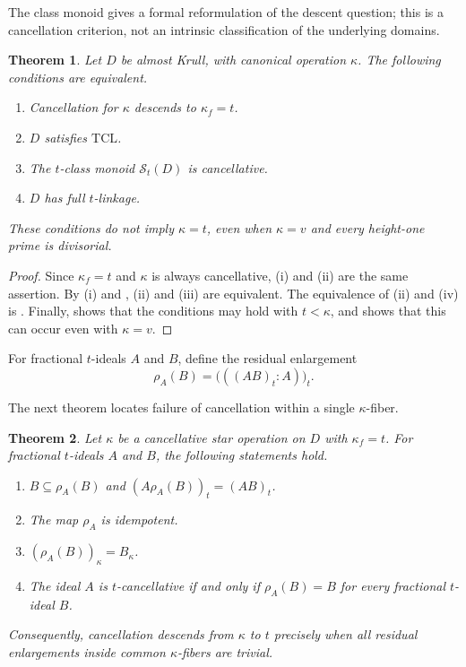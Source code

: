 \documentclass[11pt]{amsart}
\newtheorem{theorem}{Theorem}[section]
\theoremstyle{definition}
\theoremstyle{remark}
\newcommand{\Ctred}{\mathcal S_t}
\newcommand{\TCL}{\mathrm{TCL}}
\begin{document}
The class monoid gives a formal reformulation of the descent question;
this is a cancellation criterion, not an intrinsic classification of the
underlying domains.

\begin{theorem}\label{thm:exact-descent}
Let $D$ be almost Krull, with canonical operation $\kappa$.  The following
conditions are equivalent.
\begin{enumerate}[label=\textup{(\roman*)}]
\item Cancellation for $\kappa$ descends to $\kappa_f=t$.
\item $D$ satisfies $\TCL$.
\item The $t$-class monoid $\Ctred(D)$ is cancellative.
\item $D$ has full $t$-linkage.
\end{enumerate}
These conditions do not imply $\kappa=t$, even when $\kappa=v$ and every
height-one prime is divisorial.
\end{theorem}

\begin{proof}
Since $\kappa_f=t$ and $\kappa$ is always cancellative,
(i) and (ii) are the same assertion.  By
(i) and , (ii) and (iii) are equivalent.
The equivalence of (ii) and (iv) is .  Finally,
 shows that the conditions may hold with
$t<\kappa$, and  shows that this can occur even with
$\kappa=v$.
\end{proof}

For fractional $t$-ideals $A$ and $B$, define the residual enlargement
\begin{equation}\label{eq:rho}
 \rho_A(B)=\bigl(((AB)_t:A)\bigr)_t.
\end{equation}

The next theorem locates failure of cancellation within a single
$\kappa$-fiber.

\begin{theorem}\label{thm:fiber}
Let $\kappa$ be a cancellative star operation on $D$ with $\kappa_f=t$.
For fractional $t$-ideals $A$ and $B$, the following statements hold.
\begin{enumerate}[label=\textup{(\roman*)}]
\item $B\subseteq\rho_A(B)$ and
      $(A\rho_A(B))_t=(AB)_t$.
\item The map $\rho_A$ is idempotent.
\item $(\rho_A(B))_\kappa=B_\kappa$.
\item The ideal $A$ is $t$-cancellative if and only if
      $\rho_A(B)=B$ for every fractional $t$-ideal $B$.
\end{enumerate}
Consequently, cancellation descends from $\kappa$ to $t$ precisely when all
residual enlargements inside common $\kappa$-fibers are trivial.
\end{theorem}
\end{document}
